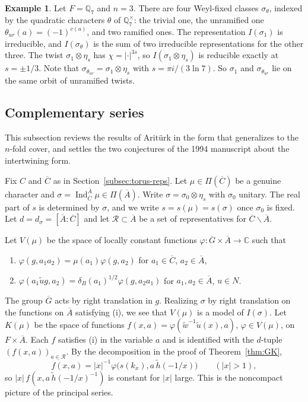 \documentclass[12pt,letterpaper]{article}
\numberwithin{equation}{section}
\theoremstyle{definition}
\newtheorem{xexample}[theorem]{Example}
\newcommand{\C}{\mathbb C}
\newcommand{\Q}{\mathbb Q}
\newcommand{\bG}{\overline{G}}
\newcommand{\bA}{\overline{A}}
\newcommand{\bC}{\overline{C}}
\newcommand{\wt}{\tilde w}
\newcommand{\hl}{\tilde h}
\newcommand{\ul}{\tilde u}
\DeclareMathOperator{\Ind}{Ind}
\begin{document}
\begin{xexample}\label{ex:red-Q7}
Let $F=\Q_7$ and $n=3$.  There are four Weyl-fixed classes $\sigma_\theta$, indexed by the
quadratic characters $\theta$ of $\Q_7^\times$: the trivial one, the unramified one
$\theta_{ur}(a)=(-1)^{v(a)}$, and two ramified ones.  The representation $I(\sigma_1)$ is
irreducible, and $I(\sigma_\theta)$ is the sum of two irreducible representations for the
other three.  The twist $\sigma_1\otimes\eta_s$ has $\chi=|\cdot|^{3s}$, so
$I(\sigma_1\otimes\eta_s)$ is reducible exactly at $s=\pm1/3$.  Note that
$\sigma_{\theta_{ur}}=\sigma_1\otimes\eta_{s}$ with $s=\pi i/(3\ln7)$.  So $\sigma_1$ and
$\sigma_{\theta_{ur}}$ lie on the same orbit of unramified twists.
\end{xexample}

\subsection{Complementary series}\label{subsec:cs}

This subsection reviews the results of Arit\"urk \cite{Ar80} in the form that generalizes
to the $n$-fold cover, and settles the two conjectures of the 1994 manuscript about the
intertwining form.

Fix $C$ and $\bC$ as in Section~\ref{subsec:torus-reps}.  Let $\mu\in\Pi(\bC)$ be a genuine
character and $\sigma=\Ind_{\bC}^{\bA}\mu\in\Pi(\bA)$.  Write $\sigma=\sigma_0\otimes\eta_s$ with
$\sigma_0$ unitary.  The real part of $s$ is determined by $\sigma$, and we write
$s=s(\mu)=s(\sigma)$ once $\sigma_0$ is fixed.  Let $d=d_\sigma=[\bA:\bC]$ and let
$\mathcal R\subset\bA$ be a set of representatives for $\bC\backslash\bA$.

Let $V(\mu)$ be the space of locally constant functions
$\varphi:\bG\times\bA\to\C$ such that
\begin{enumerate}[label=(\roman*),leftmargin=*,itemsep=1pt]
\item $\varphi(g,a_1a_2)=\mu(a_1)\varphi(g,a_2)$ for $a_1\in\bC$, $a_2\in\bA$,
\item $\varphi(a_1\tilde ug,a_2)=\delta_B(a_1)^{1/2}\varphi(g,a_2a_1)$ for $a_1,a_2\in\bA$, $u\in N$.
\end{enumerate}
The group $\bG$ acts by right translation in $g$.  Realizing $\sigma$ by right translation
on the functions on $\bA$ satisfying (i), we see that $V(\mu)$ is a model of $I(\sigma)$.
Let $K(\mu)$ be the space of functions
$f(x,a)=\varphi(\wt^{-1}\ul(x),a)$, $\varphi\in V(\mu)$, on $F\times\bA$.  Each $f$ satisfies
(i) in the variable $a$ and is identified with the $d$-tuple $(f(x,a))_{a\in\mathcal R}$.  By
the decomposition in the proof of Theorem~\ref{thm:GK},
\[
f(x,a)=|x|^{-1}\varphi\bigl(s(k_x),a\,\hl(-1/x)\bigr)\qquad(|x|>1),
\]
so $|x|\,f(x,a\,\hl(-1/x)^{-1})$ is constant for $|x|$ large.  This is the noncompact
picture of the principal series.
\end{document}
